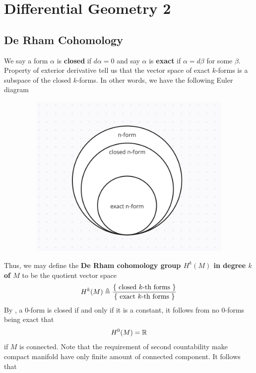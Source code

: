 \documentclass{report}
\begin{document}
\chapter{Differential Geometry 2}
\section{De Rham Cohomology}
\begin{abstract}

\end{abstract}
\begin{mdframed}
We say a form $\alpha $ is \textbf{closed} if $d\alpha =0$ and say $\alpha $ is  \textbf{exact} if $\alpha=d\beta $ for some $\beta $. Property of exterior derivative tell us that the vector space of exact $k$-forms is a subspace of the closed $k$-forms. In other words, we have the following Euler diagram 
\begin{center}
   \begin{minipage}{0.9\linewidth}  
       \centering
\includegraphics[height=8cm,width=14cm]{ednf}
   \end{minipage}
\end{center}
Thus, we may define the \textbf{De Rham cohomology group $H^k(M)$ in degree $k$ of  $M$} to be the quotient vector space 
\begin{align*}
H^k(M)\triangleq \frac{\{ \text{ closed $k$-th forms } \}}{\{ \text{ exact $k$-th forms } \}}
\end{align*}
By , a 0-form is closed if and only if it is a constant, it follows from no 0-forms being exact that 
\begin{align*}
H^0(M)= \mathbb{R}
\end{align*}
if $M$ is connected. Note that the requirement of second countability make compact manifold have only finite amount of connected component. It follows that 

\end{mdframed}
\end{document}
